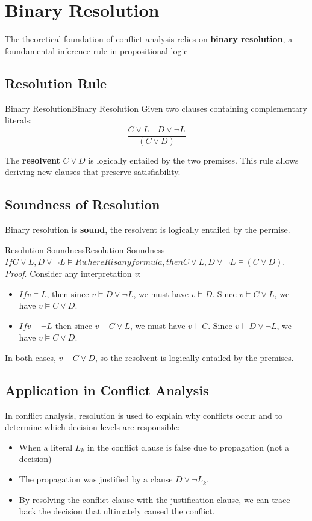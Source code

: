 \documentclass[a4paper]{article}
\theoremstyle{definition}
\begin{document}
\section{Binary Resolution}
The theoretical foundation of conflict analysis relies on \textbf{binary resolution}, a foundamental inference rule in propositional logic
\subsection{Resolution Rule}
\begin{definition}{Binary Resolution}{Binary Resolution}
Given two clauses containing complementary literals:
\[
  \frac{C \vee L \quad D \vee \lnot L}{(C \vee D)}
\]
\end{definition}
The \textbf{resolvent} \( C \vee D \) is logically entailed by the two premises. This rule allows deriving new 
clauses that preserve satisfiability.
\subsection{Soundness of Resolution}
Binary resolution is \textbf{sound}, the resolvent is logically entailed by the permise.
\begin{theorem}{Resolution Soundness}{Resolution Soundness}
\( If {C \vee L, D \vee \lnot L} \models R where R is any formula, then {C \vee
L, D \vee \lnot L} \models (C \vee D) \).
\vspace{1em}
\noindent
\newline
\textit{Proof}. Consider any interpretation \( v \):
\begin{itemize}
    \item \( If v \models L \), then since \( v \models D \vee \lnot L \), we must 
        have \( v \models D \). Since \( v \models C \vee L \), we have \( v \models C \vee D \).
    \item \( If v \models \lnot L \) then since \( v \models C \vee L \), we must have \( v \models C \). Since \( v \models D \vee \lnot L \),
        we have \( v \models C \vee D \).
\end{itemize}
In both cases, \( v \models C \vee D \), so the resolvent is logically entailed by the premises.
\end{theorem}
\subsection{Application in Conflict Analysis}
In conflict analysis, resolution is used to explain why conflicts occur and to determine which
decision levels are responsible:
\begin{itemize}
    \item When a literal \( L_k \) in the conflict clause is false due to propagation (not a decision)
    \item The propagation was justified by a clause \( D \vee \lnot L_k \).
    \item By resolving the conflict clause with the justification clause, we can trace back the decision that ultimately caused the conflict.
\end{itemize}
\end{document}
